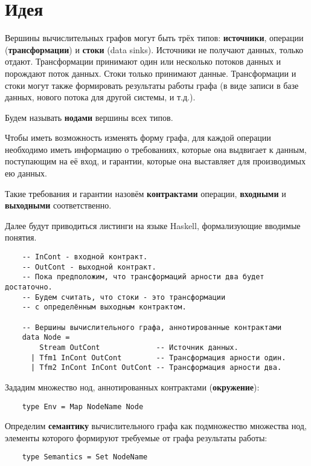 \section{Идея}

Вершины вычислительных графов могут быть трёх типов: \textbf{источники}, операции (\textbf{трансформации}) и \textbf{стоки} (data sinks). Источники не получают данных, только отдают. Трансформации принимают один или несколько потоков данных и порождают поток данных. Стоки только принимают данные. Трансформации и стоки могут также формировать результаты работы графа (в виде записи в базе данных, нового потока для другой системы, и т.д.).

Будем называть \textbf{нодами} вершины всех типов.

Чтобы иметь возможность изменять форму графа, для каждой операции необходимо иметь информацию о требованиях, которые она выдвигает к данным, поступающим на её вход, и гарантии, которые она выставляет для производимых ею данных.

Такие требования и гарантии назовём \textbf{контрактами} операции, \textbf{входными} и \textbf{выходными} соответственно.

Далее будут приводиться листинги на языке Haskell, формализующие вводимые понятия.

\begin{lstlisting}
    -- InCont - входной контракт.
    -- OutCont - выходной контракт.
    -- Пока предположим, что трансформаций арности два будет достаточно.
    -- Будем считать, что стоки - это трансформации
    -- с определённым выходным контрактом.

    -- Вершины вычислительного графа, аннотированные контрактами
    data Node =
        Stream OutCont             -- Источник данных.
      | Tfm1 InCont OutCont        -- Трансформация арности один.
      | Tfm2 InCont InCont OutCont -- Трансформация арности два.
\end{lstlisting}

Зададим множество нод, аннотированных контрактами (\textbf{окружение}):
\begin{lstlisting}
    type Env = Map NodeName Node
\end{lstlisting}

Определим \textbf{семантику} вычислительного графа как подмножество множества нод, элементы которого формируют требуемые от графа результаты работы:
\begin{lstlisting}
    type Semantics = Set NodeName
\end{lstlisting}

